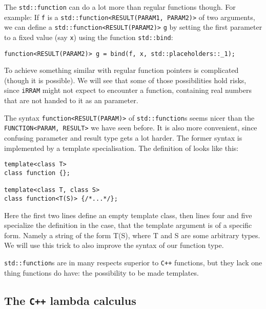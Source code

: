 \documentclass{article}
\newcommand{\irram}{\texttt{iRRAM}\xspace}
\newcommand{\cc}{\texttt{C++}\xspace}
\newcommand{\ir}[1]{\texttt{#1}}
\newcommand{\code}[1]{\texttt{#1}}
\begin{document}
The \code{std::function} can do a lot more than regular functions though. For example: If \code{f} is a \code{std::function<RESULT(PARAM1, PARAM2)>} of two arguments, we can define a \code{std::function<RESULT(PARAM2)>} \code{g} by setting the first parameter to a fixed value (say \code x) using the function \code{std::bind}:
\begin{lstlisting}
function<RESULT(PARAM2)> g = bind(f, x, std::placeholders::_1);
\end{lstlisting}
To achieve something similar with regular function pointers is complicated (though it is possible). We will see that some of those possibilities hold risks, since \irram might not expect to encounter a function, containing real numbers that are not handed to it as an parameter.

The syntax \code{function<RESULT(PARAM)>} of \code{std::function}s seems nicer than the \ir{FUNCTION<PARAM, RESULT>} we have seen before. It is also more convenient, since confusing parameter and result type gets a lot harder. The former syntax is implemented by a template specialisation. The definition of looks like this:
\begin{lstlisting}
template<class T>
class function {};

template<class T, class S>
class function<T(S)> {/*...*/};
\end{lstlisting}
Here the first two lines define an empty template class, then lines four and five specialize the definition in the case, that the template argument is of a specific form. Namely a string of the form T(S), where T and S are some arbitrary types. We will use this trick to also improve the syntax of our function type.

\code{std::function}s are in many respects superior to \cc functions, but they lack one thing functions do have: the possibility to be made templates.


\subsection{The \cc lambda calculus}\label{sec: The C++ lambda calculus}
\end{document}
